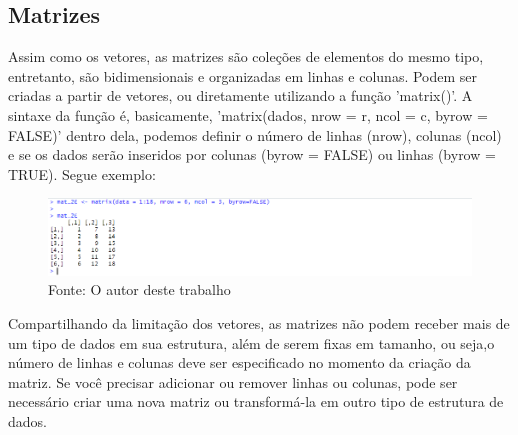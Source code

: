     \subsection{Matrizes}
    		 Assim como os vetores, as matrizes são coleções de elementos do mesmo tipo, entretanto, são bidimensionais e organizadas em linhas e colunas. Podem ser criadas a partir de vetores, ou diretamente utilizando a função 'matrix()'. A sintaxe da função é, basicamente, 'matrix(dados, nrow = r, ncol = c, byrow = FALSE)' dentro dela, podemos definir o número de linhas (nrow), colunas (ncol) e se os dados serão inseridos por colunas (byrow = FALSE) ou linhas (byrow = TRUE). Segue exemplo:\begin{figure}[H]
    		 	\centering
    		 	\caption{}
    		 	\includegraphics[width=1.5\linewidth]{Prints/screenshot005}
    		 	\label{fig:screenshot005}
    		 	{\tiny \sf Fonte: O autor deste trabalho }
    		 \end{figure}
    	 	 Compartilhando da limitação dos vetores, as matrizes não podem receber mais de um tipo de dados em sua estrutura, além de serem fixas em tamanho, ou seja,o número de linhas e colunas deve ser especificado no momento da criação da matriz. Se você precisar adicionar ou remover linhas ou colunas, pode ser necessário criar uma nova matriz ou transformá-la em outro tipo de estrutura de dados.
